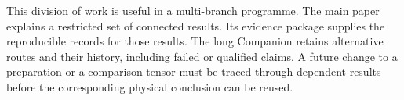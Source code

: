 This division of work is useful in a multi-branch programme. The main
paper explains a restricted set of connected results. Its evidence
package supplies the reproducible records for those results. The long
Companion retains alternative routes and their history, including
failed or qualified claims. A future change to a preparation or a
comparison tensor must be traced through dependent results before the
corresponding physical conclusion can be reused.

